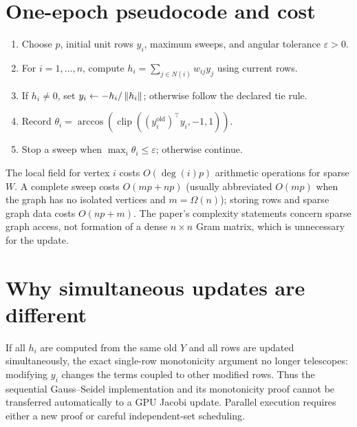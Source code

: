 \section{One-epoch pseudocode and cost}
\begin{tcolorbox}[colback=navy!2,colframe=navy!45,title=EVA with sequential in-place updates]
\begin{enumerate}
\item Choose $p$, initial unit rows $y_i$, maximum sweeps, and angular tolerance $\varepsilon>0$.
\item For $i=1,\ldots,n$, compute $h_i=\sum_{j\in N(i)}w_{ij}y_j$ using current rows.
\item If $h_i\ne0$, set $y_i\gets-h_i/\left\lVert h_i\right\rVert$; otherwise follow the declared tie rule.
\item Record $\theta_i=\arccos(\operatorname{clip}((y_i^{\mathrm{old}})^\top y_i,-1,1))$.
\item Stop a sweep when $\max_i\theta_i\le\varepsilon$; otherwise continue.
\end{enumerate}
\end{tcolorbox}
The local field for vertex $i$ costs $O(\deg(i)p)$ arithmetic operations for sparse $W$. A complete sweep costs $O(mp+np)$ (usually abbreviated $O(mp)$ when the graph has no isolated vertices and $m=\Omega(n)$); storing rows and sparse graph data costs $O(np+m)$. The paper's complexity statements concern sparse graph access, not formation of a dense $n\times n$ Gram matrix, which is unnecessary for the update.

\section{Why simultaneous updates are different}
If all $h_i$ are computed from the same old $Y$ and all rows are updated simultaneously, the exact single-row monotonicity argument no longer telescopes: modifying $y_i$ changes the terms coupled to other modified rows. Thus the sequential Gauss--Seidel implementation and its monotonicity proof cannot be transferred automatically to a GPU Jacobi update. Parallel execution requires either a new proof or careful independent-set scheduling.
